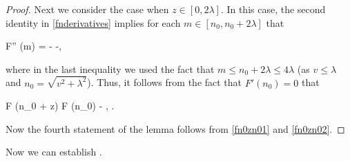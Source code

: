 \documentclass[10pt,a4paper]{article}
\theoremstyle{plain}\newtheorem{theorem}{Theorem}
\theoremstyle{definition}
\begin{document}
\begin{proof}
	Next we consider the case when $z \in [0, 2 \lambda]$. In this case, the second identity in \eqref{fnderivatives} implies for each $m \in [n_0, n_0 + 2 \lambda]$ that 
	\begin{flalign*}
	F'' (m) = \displaystyle{} \le -\displaystyle{} \le -\displaystyle{},
	\end{flalign*}
	
	\noindent where in the last inequality we used the fact that $m \le n_0 + 2 \lambda \le 4 \lambda$ (as $v \le \lambda$ and $n_0 = \sqrt{v^2 + \lambda^2}$). Thus, it follows from the fact that $F' (n_0) = 0$ that 
	\begin{flalign}
	\label{fn0zn02}
	F (n_0 + z) \le F (n_0) - \displaystyle{}, \quad {}.
	\end{flalign}
	
	\noindent Now the fourth statement of the lemma follows from \eqref{fn0zn01} and \eqref{fn0zn02}. 
	\end{proof}
	
	Now we can establish . 
	
\end{document}
